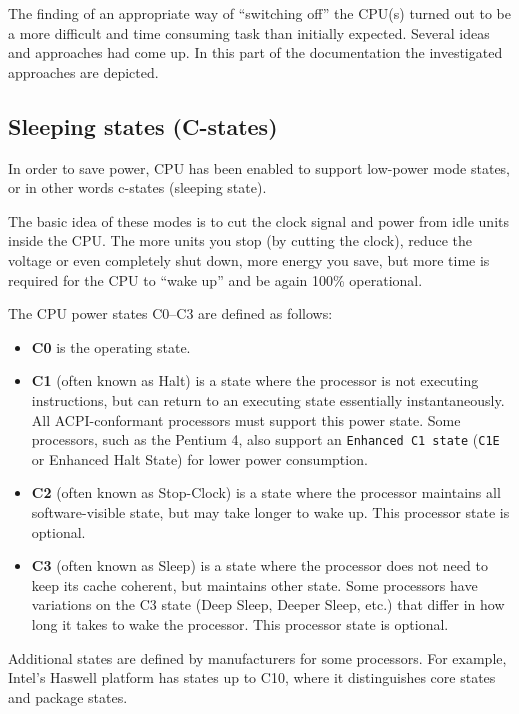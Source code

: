 \documentclass[]{report}
\begin{document}
The finding of an appropriate way of ``switching off'' the CPU(s) turned
out to be a more difficult and time consuming task than initially
expected. Several ideas and approaches had come up. In this part of the
documentation the investigated approaches are depicted.

\subsection{Sleeping states (C-states)}\label{sleeping-states-c-states}

In order to save power, CPU has been enabled to support low-power mode
states, or in other words c-states (sleeping state).

The basic idea of these modes is to cut the clock signal and power from
idle units inside the CPU. The more units you stop (by cutting the
clock), reduce the voltage or even completely shut down, more energy you
save, but more time is required for the CPU to ``wake up'' and be again
100\% operational.

The CPU power states C0--C3 are defined as follows:

\begin{itemize}
\item
  \textbf{C0} is the operating state.
\item
  \textbf{C1} (often known as Halt) is a state where the processor is
  not executing instructions, but can return to an executing state
  essentially instantaneously. All ACPI-conformant processors must
  support this power state. Some processors, such as the Pentium 4, also
  support an \lstinline!Enhanced C1 state! (\lstinline!C1E! or Enhanced
  Halt State) for lower power consumption.
\item
  \textbf{C2} (often known as Stop-Clock) is a state where the processor
  maintains all software-visible state, but may take longer to wake up.
  This processor state is optional.
\item
  \textbf{C3} (often known as Sleep) is a state where the processor does
  not need to keep its cache coherent, but maintains other state. Some
  processors have variations on the C3 state (Deep Sleep, Deeper Sleep,
  etc.) that differ in how long it takes to wake the processor. This
  processor state is optional.
\end{itemize}

Additional states are defined by manufacturers for some processors. For
example, Intel's Haswell platform has states up to C10, where it
distinguishes core states and package states.
\end{document}
